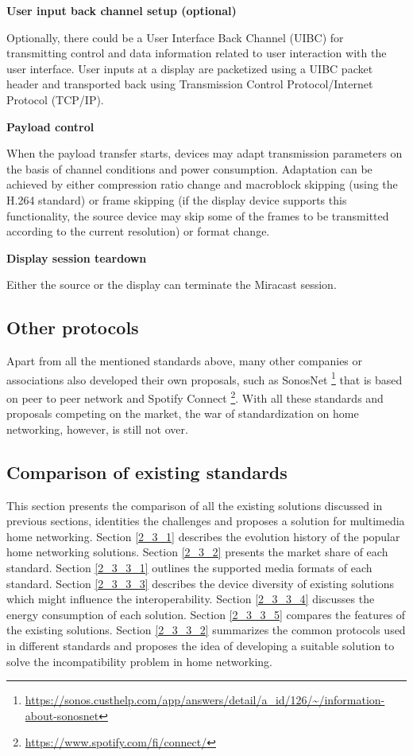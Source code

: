 \textbf{User input back channel setup (optional)}

Optionally, there could be a User Interface Back Channel (UIBC) for transmitting
control and data information related to user interaction with the user interface. User inputs at a display are packetized using a UIBC packet header and transported back using Transmission Control Protocol/Internet Protocol (TCP/IP).

\textbf{Payload control}

When the payload transfer starts, devices may adapt transmission parameters on
the basis of channel conditions and power consumption. Adaptation can be achieved by either compression ratio change and macroblock skipping (using the H.264 standard) or frame skipping (if the display device supports this functionality, the source device may skip some of the frames to be transmitted according to the current resolution) or format change.

\textbf{Display session teardown}

Either the source or the display can terminate the Miracast session.
\subsection{Other protocols\label{2_2_6}}
Apart from all the mentioned standards above, many other companies or associations 
also developed their own proposals, such as SonosNet \cite{sonosnet}
\footnote{\url{https://sonos.custhelp.com/app/answers/detail/a_id/126/~/information-about-sonosnet}}
that is based on peer to peer network and Spotify Connect \cite{spotifyconnect}
\footnote{\url{https://www.spotify.com/fi/connect/}}. With all these standards
and proposals competing on the market, the war of standardization on home
networking, however, is still not over.

\subsection{Comparison of existing standards\label{2_3}} 
This section presents the comparison of all the existing solutions discussed in
previous sections, identities the challenges and proposes a solution for
multimedia home networking. Section \ref{2_3_1} describes the evolution history
of the popular home networking solutions. Section \ref{2_3_2} presents the
market share of each standard. Section \ref{2_3_3_1} outlines the supported
media formats of each standard. Section \ref{2_3_3_3} describes the device
diversity of existing solutions which might influence the interoperability.
Section \ref{2_3_3_4} discusses the energy consumption of each solution. Section
\ref{2_3_3_5} compares the features of the existing solutions. Section
\ref{2_3_3_2} summarizes the common protocols used in different standards and
proposes the idea of developing a suitable solution to solve the
incompatibility problem in home networking.
